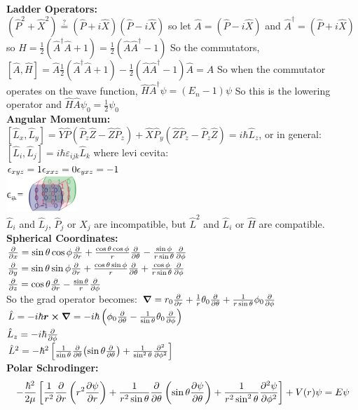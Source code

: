 \documentclass[10pt,landscape,a4paper]{article}
\newcommand{\half}{\frac{1}{2}}
\newcommand{\minititle}[1]{\textbf{#1:}\\}
\renewcommand{\^}[1]{\ensuremath{\hat{#1}}}
\begin{document}
\begin{multicols}{4}
	\minititle{Ladder Operators}
	$ (\^P^2+\^X^2 ) \overset{?}{=} (\^P + i\^X)(\^P-i\^X) $ so let $ \^A = (\^P-i\^X) $ and $ \^A^\dagger = (\^P + i\^X) $ so $ \^H = \half(\^A^\dagger\^A+1) = \half(\^A\^A^\dagger-1) $
	So the commutators, $ \left[\^A,\^H\right] = \^A\half(\^A^\dagger\^A + 1) - \half(\^A\^A^\dagger - 1)\^A = \^A $ So when the commutator operates on the wave function, $ \^H\^A^\dagger\psi = (E_n-1)\psi $ So this is the lowering operator and $ \^H\^A\psi_0 = \half\psi_0 $\\
	\minititle{Angular Momentum}
	$ \left[\^L_x,\^L_y\right] = \^Y\^P(\^P_z\^Z-\^Z\^P_z) + \^X\^P_y(\^Z\^P_z - \^P_z\^Z) = i\hbar\^L_z $, or in general: $ \left[\^L_i,\^L_j\right] = i\hbar\varepsilon_{ijk}\^L_k $ where	levi cevita:\\
	$ \epsilon_{xyz} = 1 \\
	\epsilon_{xxz} = 0 \\	
	\epsilon_{yxz} = -1 $\\
	\includegraphics[width=0.2\textwidth]{levicevita.png}\\
	$ \^L_i $ and $ \^L_j $, $ \^P_j $ or $ \^X_j $ are incompatible, but $ \^L^2 $ and $ \^L_i $ or $ \^H $ are compatible.\\ 
	\minititle{Spherical Coordinates}
	$ \frac{\partial}{\partial x} = \sin\theta\cos\phi\frac{\partial}{\partial r} + \frac{\cos\theta\cos\phi}{r} \pdv{\theta} - \frac{\sin\phi}{r\sin\theta}\pdv{\phi} $ \\
	$ \pdv{y} = \sin\theta\sin\phi\pdv{r} + \frac{\cos\theta\sin\phi}{r}\pdv{\theta} + \frac{\cos\phi}{r\sin\theta}\pdv{\phi} $\\
	$ \pdv{z} = \cos\theta\pdv{r} - \frac{\sin\theta}{r}\pdv{\phi} $\\
	So the grad operator becomes: $ \grad = r_0\pdv{r}+\frac{1}{r}\theta_0\pdv{\theta} + \frac{1}{r\sin\theta}\phi_0\pdv{\phi} $\\
	$ \^L = -i\hbar \vb*{r}\cross\grad = -i\hbar\left(\phi_0\pdv{\theta} - \frac{1}{\sin\theta}\theta_0\pdv{\phi}\right) $\\
	$ \^L_z = -i\hbar\pdv{\phi} $ \\
	$ \^L^2 = -\hbar^2\left[\frac{1}{\sin\theta}\pdv{\theta}(\sin\theta\pdv{\theta}) + \frac{1}{\sin^2\theta}\pdv[2]{\phi} \right] $\\
	\minititle{Polar Schrodinger}
	\[ -\frac{\hbar^2}{2\mu}\left[\frac{1}{r^2}\pdv{r}\left(r^2\pdv{\psi}{r}\right) + \frac{1}{r^2\sin\theta}\pdv{\theta}\left(\sin\theta\pdv{\psi}{\theta}\right) + \frac{1}{r^2\sin^2\theta}\pdv[2]{\psi}{\phi} \right] + V(r)\psi = E\psi \]

\end{multicols}
\end{document}
